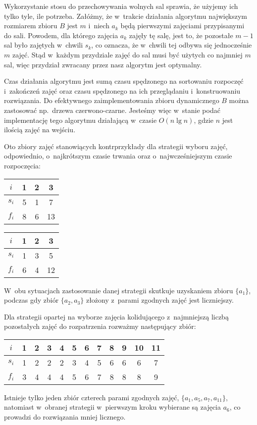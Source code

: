 Wykorzystanie stosu do przechowywania wolnych sal sprawia, że użyjemy ich tylko tyle, ile potrzeba.
Załóżmy, że w~trakcie działania algorytmu największym rozmiarem zbioru $B$ jest $m$ i~niech $a_k$ będą pierwszymi zajęciami przypisanymi do  sali.
Powodem, dla którego zajęcia $a_k$ zajęły tę salę, jest to, że pozostałe $m-1$ sal było zajętych w~chwili $s_k$, co oznacza, że w~chwili tej odbywa się jednocześnie $m$ zajęć.
Stąd w~każdym przydziale zajęć do sal musi być użytych co najmniej $m$ sal, więc przydział zwracany przez nasz algorytm jest optymalny.

Czas działania algorytmu jest sumą czasu spędzonego na sortowaniu rozpoczęć i~zakończeń zajęć oraz czasu spędzonego na ich przeglądaniu i~konstruowaniu rozwiązania.
Do efektywnego zaimplementowania zbioru dynamicznego $B$ można zastosować np.\ drzewa czerwono-czarne.
Jesteśmy więc w~stanie podać implementację tego algorytmu działającą w~czasie $O(n\lg n)$, gdzie $n$ jest ilością zajęć na wejściu.

\exercise %

\noindent Oto zbiory zajęć stanowiących kontrprzykłady dla strategii wyboru zajęć, odpowiednio, o~najkrótszym czasie trwania oraz o~najwcześniejszym czasie rozpoczęcia:
\begin{center}
	\begin{tabular}{cccc}
		$i$ & 1 & 2 & 3 \\ \hline
		$s_i$ & 5 & 1 & 7 \\
		$f_i$ & 8 & 6 & 13
	\end{tabular}
	\hskip3cm
	\begin{tabular}{cccc}
		$i$ & 1 & 2 & 3 \\ \hline
		$s_i$ & 1 & 3 & 5 \\
		$f_i$ & 6 & 4 & 12
	\end{tabular}
\end{center}
W~obu sytuacjach zastosowanie danej strategii skutkuje uzyskaniem zbioru $\{a_1\}$, podczas gdy zbiór $\{a_2,a_3\}$ złożony z~parami zgodnych zajęć jest liczniejszy.

Dla strategii opartej na wyborze zajęcia kolidującego z~najmniejszą liczbą pozostałych zajęć do rozpatrzenia rozważmy następujący zbiór:
\begin{center}
	\begin{tabular}{cccccccccccc}
		$i$ & 1 & 2 & 3 & 4 & 5 & 6 & 7 & 8 & 9 & 10 & 11 \\ \hline
		$s_i$ & 1 & 2 & 2 & 2 & 3 & 4 & 5 & 6 & 6 & 6 & 7 \\
		$f_i$ & 3 & 4 & 4 & 4 & 5 & 6 & 7 & 8 & 8 & 8 & 9
	\end{tabular}
\end{center}
Istnieje tylko jeden zbiór czterech parami zgodnych zajęć, $\{a_1,a_5,a_7,a_{11}\}$, natomiast w~obranej strategii w~pierwszym kroku wybierane są zajęcia $a_6$, co prowadzi do rozwiązania mniej licznego.
